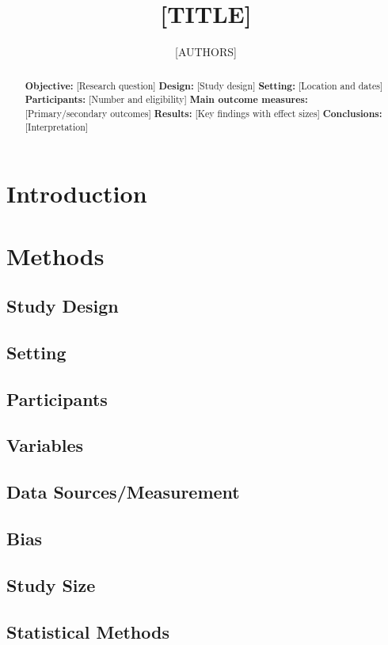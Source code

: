 \documentclass[12pt]{article}
\title{[TITLE]}
\author{[AUTHORS]\\[AFFILIATIONS]}
\date{}
\begin{document}
\maketitle

\begin{abstract}
\textbf{Objective:} [Research question]
\textbf{Design:} [Study design]
\textbf{Setting:} [Location and dates]
\textbf{Participants:} [Number and eligibility]
\textbf{Main outcome measures:} [Primary/secondary outcomes]
\textbf{Results:} [Key findings with effect sizes]
\textbf{Conclusions:} [Interpretation]
\end{abstract}

\section{Introduction}

\section{Methods}
\subsection{Study Design}
\subsection{Setting}
\subsection{Participants}
\subsection{Variables}
\subsection{Data Sources/Measurement}
\subsection{Bias}
\subsection{Study Size}
\subsection{Statistical Methods}
\end{document}
